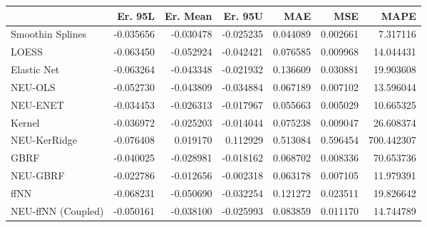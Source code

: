 \begin{tabular}{lrrrrrr}
\toprule
{} &   Er. 95L &  Er. Mean &   Er. 95U &       MAE &       MSE &        MAPE \\
\midrule
Smoothin Splines   & -0.035656 & -0.030478 & -0.025235 &  0.044089 &  0.002661 &    7.317116 \\
LOESS              & -0.063450 & -0.052924 & -0.042421 &  0.076585 &  0.009968 &   14.044431 \\
Elastic Net        & -0.063264 & -0.043348 & -0.021932 &  0.136609 &  0.030881 &   19.903608 \\
NEU-OLS            & -0.052730 & -0.043809 & -0.034884 &  0.067189 &  0.007102 &   13.596044 \\
NEU-ENET           & -0.034453 & -0.026313 & -0.017967 &  0.055663 &  0.005029 &   10.665325 \\
Kernel             & -0.036972 & -0.025203 & -0.014044 &  0.075238 &  0.009047 &   26.608374 \\
NEU-KerRidge       & -0.076408 &  0.019170 &  0.112929 &  0.513084 &  0.596454 &  700.442307 \\
GBRF               & -0.040025 & -0.028981 & -0.018162 &  0.068702 &  0.008336 &   70.653736 \\
NEU-GBRF           & -0.022786 & -0.012656 & -0.002318 &  0.063178 &  0.007105 &   11.979391 \\
ffNN               & -0.068231 & -0.050690 & -0.032254 &  0.121272 &  0.023511 &   19.826642 \\
NEU-ffNN (Coupled) & -0.050161 & -0.038100 & -0.025993 &  0.083859 &  0.011170 &   14.744789 \\
\bottomrule
\end{tabular}
